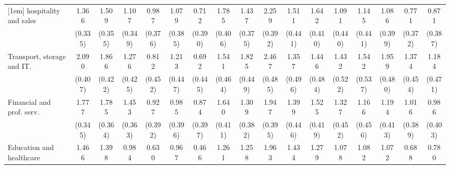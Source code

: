{\begin{tabular}{l*{16}{c}}
[1em]
hospitality and sales&       1.366\sym{***}&       1.509\sym{***}&       1.107\sym{**} &       0.987\sym{**} &       1.079\sym{**} &       0.712         &       1.785\sym{***}&       1.437\sym{***}&       2.259\sym{***}&       1.511\sym{***}&       1.642\sym{***}&       1.091\sym{*}  &       1.145\sym{**} &       1.086\sym{**} &       0.771\sym{*}  &       0.871\sym{*}  \\
                    &     (0.335)         &     (0.355)         &     (0.349)         &     (0.376)         &     (0.385)         &     (0.390)         &     (0.406)         &     (0.375)         &     (0.392)         &     (0.441)         &     (0.410)         &     (0.440)         &     (0.441)         &     (0.399)         &     (0.372)         &     (0.387)         \\
[1em]
Transport, storage and IT.&       2.090\sym{***}&       1.866\sym{***}&       1.276\sym{**} &       0.812         &       1.213\sym{**} &       0.692         &       1.541\sym{***}&       1.825\sym{***}&       2.467\sym{***}&       1.357\sym{**} &       1.446\sym{**} &       1.432\sym{**} &       1.542\sym{**} &       1.959\sym{***}&       1.374\sym{**} &       1.184\sym{*}  \\
                    &     (0.407)         &     (0.422)         &     (0.425)         &     (0.452)         &     (0.447)         &     (0.445)         &     (0.464)         &     (0.449)         &     (0.485)         &     (0.496)         &     (0.484)         &     (0.522)         &     (0.537)         &     (0.480)         &     (0.454)         &     (0.471)         \\
[1em]
Financial and prof. serv.&       1.777\sym{***}&       1.785\sym{***}&       1.453\sym{***}&       0.927\sym{*}  &       0.985\sym{*}  &       0.874\sym{*}  &       1.640\sym{***}&       1.309\sym{***}&       1.947\sym{***}&       1.399\sym{**} &       1.525\sym{***}&       1.327\sym{**} &       1.166\sym{*}  &       1.194\sym{**} &       1.016\sym{**} &       0.986\sym{*}  \\
                    &     (0.345)         &     (0.364)         &     (0.363)         &     (0.392)         &     (0.396)         &     (0.397)         &     (0.411)         &     (0.382)         &     (0.395)         &     (0.446)         &     (0.419)         &     (0.452)         &     (0.456)         &     (0.413)         &     (0.389)         &     (0.403)         \\
[1em]
Education and healthcare&       1.466\sym{***}&       1.398\sym{***}&       0.984\sym{**} &       0.630         &       0.967\sym{*}  &       0.466         &       1.261\sym{**} &       1.258\sym{**} &       1.963\sym{***}&       1.434\sym{**} &       1.279\sym{**} &       1.078\sym{*}  &       1.082\sym{*}  &       1.072\sym{**} &       0.688         &       0.780         \\

\end{tabular}}
